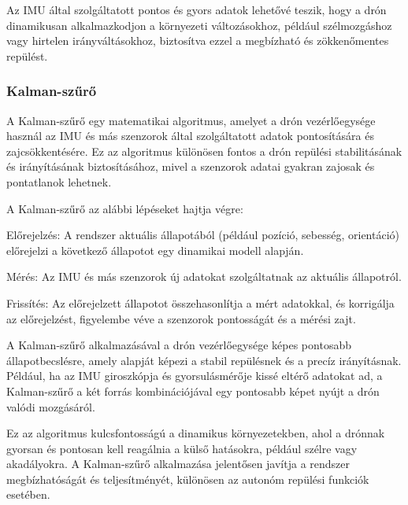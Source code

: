 Az IMU által szolgáltatott pontos és gyors adatok lehetővé teszik, hogy a drón dinamikusan alkalmazkodjon a környezeti változásokhoz, például szélmozgáshoz vagy hirtelen irányváltásokhoz, biztosítva ezzel a megbízható és zökkenőmentes repülést.

\subsubsection{Kalman-szűrő}
A Kalman-szűrő egy matematikai algoritmus, amelyet a drón vezérlőegysége használ az IMU és más szenzorok által szolgáltatott adatok pontosítására és zajcsökkentésére. Ez az algoritmus különösen fontos a drón repülési stabilitásának és irányításának biztosításához, mivel a szenzorok adatai gyakran zajosak és pontatlanok lehetnek.

A Kalman-szűrő az alábbi lépéseket hajtja végre:

Előrejelzés: A rendszer aktuális állapotából (például pozíció, sebesség, orientáció) előrejelzi a következő állapotot egy dinamikai modell alapján.

Mérés: Az IMU és más szenzorok új adatokat szolgáltatnak az aktuális állapotról.

Frissítés: Az előrejelzett állapotot összehasonlítja a mért adatokkal, és korrigálja az előrejelzést, figyelembe véve a szenzorok pontosságát és a mérési zajt.

A Kalman-szűrő alkalmazásával a drón vezérlőegysége képes pontosabb állapotbecslésre, amely alapját képezi a stabil repülésnek és a precíz irányításnak. Például, ha az IMU giroszkópja és gyorsulásmérője kissé eltérő adatokat ad, a Kalman-szűrő a két forrás kombinációjával egy pontosabb képet nyújt a drón valódi mozgásáról.

Ez az algoritmus kulcsfontosságú a dinamikus környezetekben, ahol a drónnak gyorsan és pontosan kell reagálnia a külső hatásokra, például szélre vagy akadályokra. A Kalman-szűrő alkalmazása jelentősen javítja a rendszer megbízhatóságát és teljesítményét, különösen az autonóm repülési funkciók esetében.
